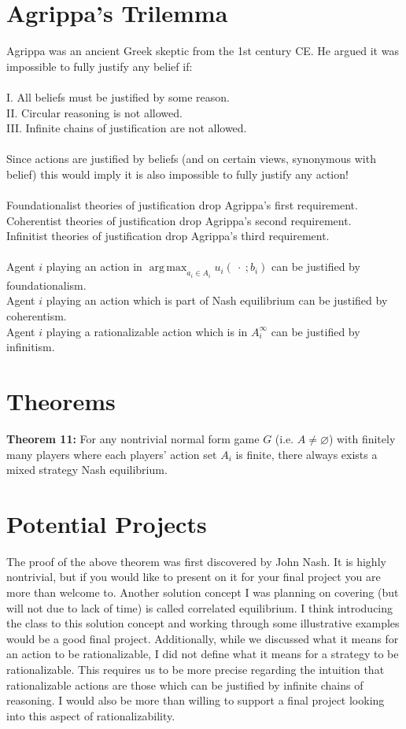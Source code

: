 \documentclass[11pt]{article}
\DeclareMathOperator*{\argmax}{arg\,max}
\theoremstyle{definition}
\theoremstyle{plain}
\begin{document}
\section{Agrippa's Trilemma}
Agrippa was an ancient Greek skeptic from the 1st century CE. He argued it was impossible to fully justify any belief if:
\\
\\
I. All beliefs must be justified by some reason.
\\
II. Circular reasoning is not allowed. 
\\
III. Infinite chains of justification are not allowed.
\\
\\
Since actions are justified by beliefs (and on certain views, synonymous with belief) this would imply it is also impossible to fully justify any action!
\\
\\
Foundationalist theories of justification drop Agrippa's first requirement.
\\
Coherentist theories of justification drop Agrippa's second requirement.
\\
Infinitist theories of justification drop Agrippa's third requirement.
\\
\\
Agent $i$ playing an action in $\argmax_{a_i \in A_i} u_i(\ \cdot \ ; b_i)$ can be justified by foundationalism.
\\
Agent $i$ playing an action which is part of Nash equilibrium can be justified by coherentism.
\\
Agent $i$ playing a rationalizable action which is in $A^{\infty}_i$ can be justified by infinitism.


\section{Theorems}
\textbf{Theorem 11:} For any nontrivial normal form game $G$ (i.e. $A \neq \varnothing$) with finitely many players where each players' action set $A_i$ is finite, there always exists a mixed strategy Nash equilibrium.

\section{Potential Projects}
The proof of the above theorem was first discovered by John Nash. It is highly nontrivial, but if you would like to present on it for your final project you are more than welcome to. Another solution concept I was planning on covering (but will not due to lack of time) is called correlated equilibrium. I think introducing the class to this solution concept and working through some illustrative examples would be a good final project. Additionally, while we discussed what it means for an action to be rationalizable, I did not define what it means for a strategy to be rationalizable. This requires us to be more precise regarding the intuition that rationalizable actions are those which can be justified by infinite chains of reasoning. I would also be more than willing to support a final project looking into this aspect of rationalizability.  
\end{document}
